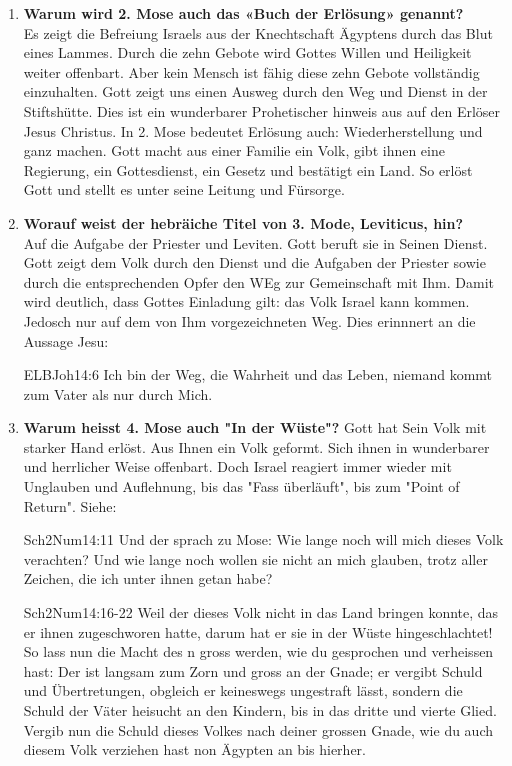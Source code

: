 
\begin{enumerate}
    \item \textbf{Warum wird 2. Mose auch das «Buch der Erlösung» genannt?}\\
    Es zeigt die Befreiung Israels aus der Knechtschaft Ägyptens durch das Blut eines Lammes. Durch die zehn Gebote wird Gottes Willen und Heiligkeit weiter offenbart. Aber kein Mensch ist fähig diese zehn Gebote vollständig einzuhalten. Gott zeigt uns einen Ausweg durch den Weg und Dienst in der Stiftshütte. Dies ist ein wunderbarer Prohetischer hinweis aus auf den Erlöser Jesus Christus. In 2. Mose bedeutet Erlösung auch: Wiederherstellung und ganz machen. Gott macht aus einer Familie ein Volk, gibt ihnen eine Regierung, ein Gottesdienst, ein Gesetz und bestätigt ein Land. So erlöst Gott und stellt es unter seine Leitung und Fürsorge.
    \item \textbf{Worauf weist der hebräiche Titel von 3. Mode, Leviticus, hin?}\\
    Auf die Aufgabe der Priester und Leviten. Gott beruft sie in Seinen Dienst. Gott zeigt dem Volk durch den Dienst und die Aufgaben der Priester sowie durch die entsprechenden Opfer den WEg zur Gemeinschaft mit Ihm. Damit wird deutlich, dass Gottes Einladung gilt: das Volk Israel kann kommen. Jedosch nur auf dem von Ihm vorgezeichneten Weg. Dies erinnnert an die Aussage Jesu:
    \begin{bibeltext}{ELB}{Joh}{14:6}
        Ich bin der Weg, die Wahrheit und das Leben, niemand kommt zum Vater als nur durch Mich.
    \end{bibeltext}
    \item \textbf{Warum heisst 4. Mose auch "In der Wüste"?}
    Gott hat Sein Volk mit starker Hand erlöst. Aus Ihnen ein Volk geformt. Sich ihnen in wunderbarer und herrlicher Weise offenbart. Doch Israel reagiert immer wieder mit Unglauben und Auflehnung, bis das "Fass überläuft", bis zum "Point of Return". Siehe:
    \begin{bibeltext}{Sch2}{Num}{14:11}
        Und der \herr{} sprach zu Mose: \flqq Wie lange noch will mich dieses Volk verachten? Und wie lange noch wollen sie nicht an mich glauben, trotz aller Zeichen, die ich unter ihnen getan habe?\frqq{}
    \end{bibeltext}
    \begin{bibeltext}{Sch2}{Num}{14:16-22}
        Weil der \herr{} dieses Volk nicht in das Land bringen konnte, das er ihnen zugeschworen hatte, darum hat er sie in der Wüste hingeschlachtet! So lass nun die Macht des \herr n gross werden, wie du gesprochen und verheissen hast: \flqq Der \herr{} ist langsam zum Zorn und gross an der Gnade; er vergibt Schuld und Übertretungen, obgleich er keineswegs ungestraft lässt, sondern die Schuld der Väter heisucht an den Kindern, bis in das dritte und vierte Glied. Vergib nun die Schuld dieses Volkes nach deiner grossen Gnade, wie du auch diesem Volk verziehen hast non Ägypten an bis hierher.\frqq{}


\end{bibeltext}
\end{enumerate}
